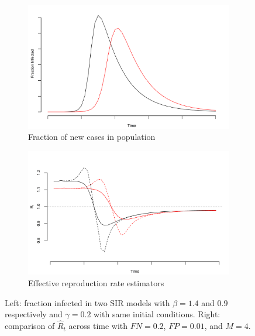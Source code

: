 \documentclass[12pt]{article}
\begin{document}
\begin{figure}[!th]
\centering
\begin{subfigure}{.5\textwidth}
  \centering
  \includegraphics[width=.9\linewidth]{../methods/figs/sir.png}
  \caption{Fraction of new cases in population}
  \label{fig:fracpop}
\end{subfigure}%
\begin{subfigure}{.5\textwidth}
  \centering
  \includegraphics[width=.9\linewidth]{../methods/figs/sir_rt_comparison.png}
  \caption{Effective reproduction rate estimators}
  \label{fig:eff}
\end{subfigure}
\caption{Left: fraction infected in two SIR models with $\beta = 1.4$ and $0.9$ respectively and $\gamma = 0.2$ with same initial conditions. Right: comparison of $\hat R_t$ across time with $FN = 0.2$, $FP = 0.01$, and $M = 4$.}
\label{fig:comparison}
\end{figure}
\end{document}
